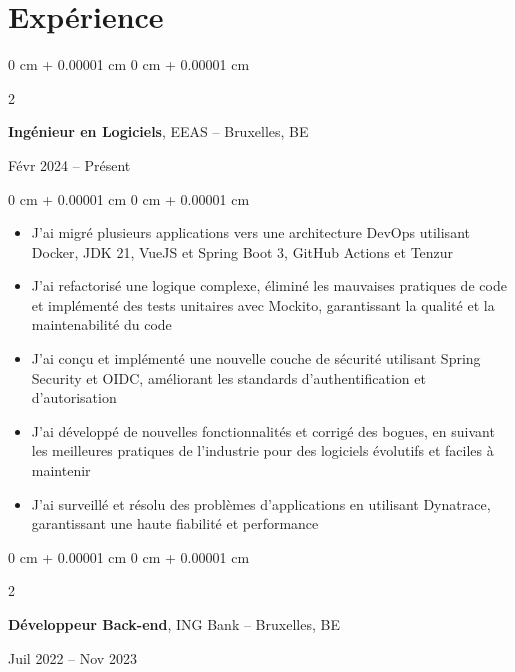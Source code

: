 \documentclass[10pt, letterpaper]{article}
\newenvironment{highlights}{
    \begin{itemize}[
        topsep=0.10 cm,
        parsep=0.10 cm,
        partopsep=0pt,
        itemsep=0pt,
        leftmargin=0 cm + 10pt
    ]
}{
    \end{itemize}
} %
\newenvironment{onecolentry}{
    \begin{adjustwidth}{
        0 cm + 0.00001 cm
    }{
        0 cm + 0.00001 cm
    }
}{
    \end{adjustwidth}
} %
\newenvironment{twocolentry}[2][]{
    \onecolentry
    \def\secondColumn{#2}
    \setcolumnwidth{\fill, 4.5 cm}
    \begin{paracol}{2}
}{
    \switchcolumn \raggedleft \secondColumn
    \end{paracol}
    \endonecolentry
} %
\begin{document}
    \section{Expérience}

        \begin{twocolentry}{
            Févr 2024 – Présent
        }
            \textbf{Ingénieur en Logiciels}, EEAS -- Bruxelles, BE
        \end{twocolentry}

        \vspace{0.10 cm}
        
        \begin{onecolentry}
            \begin{highlights}
                \item J'ai migré plusieurs applications vers une architecture DevOps utilisant Docker, JDK 21, VueJS et Spring Boot 3, GitHub Actions et Tenzur
                \item J'ai refactorisé une logique complexe, éliminé les mauvaises pratiques de code et implémenté des tests unitaires avec Mockito, garantissant la qualité et la maintenabilité du code
                \item J'ai conçu et implémenté une nouvelle couche de sécurité utilisant Spring Security et OIDC, améliorant les standards d'authentification et d'autorisation
                \item J'ai développé de nouvelles fonctionnalités et corrigé des bogues, en suivant les meilleures pratiques de l'industrie pour des logiciels évolutifs et faciles à maintenir
                \item J'ai surveillé et résolu des problèmes d'applications en utilisant Dynatrace, garantissant une haute fiabilité et performance
            \end{highlights}
        \end{onecolentry}
        
        \vspace{0.2 cm}

        \begin{twocolentry}{
            Juil 2022 – Nov 2023
        }
            \textbf{Développeur Back-end}, ING Bank -- Bruxelles, BE
        \end{twocolentry}

        \vspace{0.10 cm}
        
\end{document}
